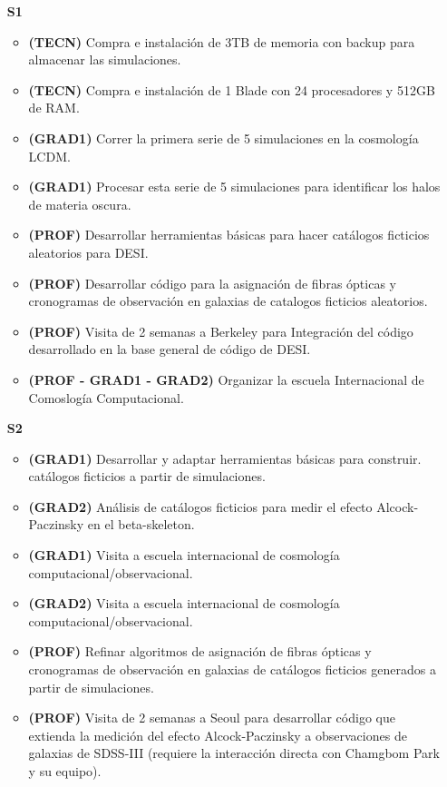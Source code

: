\begin{itemize}
\item[\bf S1]
\begin{itemize}
\item {\bf (TECN)} Compra e instalaci\'on de 3TB de memoria con backup
  para almacenar las simulaciones.
\item {\bf (TECN)} Compra e instalaci\'on de 1 Blade con 24
  procesadores y 512GB de RAM.
\item {\bf (GRAD1)} Correr la primera serie de 5 simulaciones en la
  cosmolog\'ia LCDM. 
\item {\bf (GRAD1)} Procesar esta serie de 5 simulaciones para
  identificar los halos de materia oscura.
\item {\bf (PROF)} Desarrollar herramientas b\'asicas para hacer cat\'alogos
  ficticios aleatorios para DESI.  
\item {\bf (PROF)} Desarrollar c\'odigo para la asignaci\'on de fibras
  \'opticas y cronogramas de observaci\'on en galaxias de catalogos
  ficticios aleatorios. 
\item {\bf (PROF)} Visita de 2 semanas a Berkeley para Integraci\'on del
  c\'odigo desarrollado en la base general de c\'odigo de DESI.
\item {\bf (PROF - GRAD1 - GRAD2)} Organizar la escuela Internacional de
  Comoslog\'ia Computacional.   
\end{itemize}


\item[{\bf S2}]
\begin{itemize}
\item {\bf (GRAD1)} Desarrollar y adaptar herramientas b\'asicas para construir.
  cat\'alogos ficticios a partir de simulaciones.
\item {\bf (GRAD2)} An\'alisis de cat\'alogos ficticios para medir
  el efecto Alcock-Paczinsky en el beta-skeleton.
\item {\bf (GRAD1)} Visita a escuela internacional de cosmolog\'ia computacional/observacional.
\item {\bf (GRAD2)} Visita a escuela internacional de cosmolog\'ia computacional/observacional.
\item {\bf (PROF)} Refinar algoritmos de asignaci\'on de fibras
  \'opticas y cronogramas de observaci\'on en galaxias de cat\'alogos
  ficticios generados a partir de simulaciones.
\item {\bf (PROF)} Visita de 2 semanas a Seoul para desarrollar c\'odigo que 
  extienda la medici\'on del efecto Alcock-Paczinsky a observaciones
  de galaxias de SDSS-III (requiere la interacci\'on directa con
  Chamgbom Park y su equipo).
\end{itemize}



\end{itemize}
